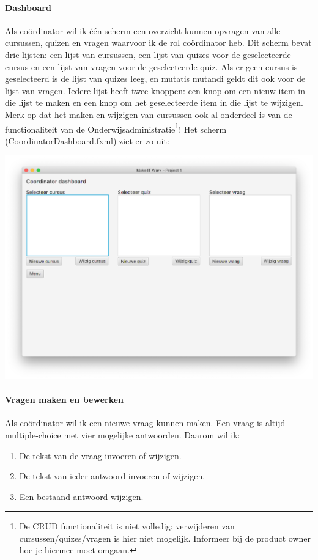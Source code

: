 \documentclass[11pt, a4paper]{article}
\begin{document}
\paragraph{Dashboard}
Als co\"ordinator wil ik \'e\'en scherm een overzicht kunnen opvragen van alle cursussen, quizen en vragen waarvoor ik de rol co\"ordinator heb.
Dit scherm bevat drie lijsten: een lijst van cursussen, een lijst van quizes voor de geselecteerde cursus en een lijst van vragen voor de geselecteerde quiz.
Als er geen cursus is geselecteerd is de lijst van quizes leeg, en mutatis mutandi geldt dit ook voor de lijst van vragen.
Iedere lijst heeft twee knoppen: een knop om een nieuw item in die lijst te maken en een knop om het geselecteerde item in die lijst te wijzigen.
Merk op dat het maken en wijzigen van cursussen ook al onderdeel is van de functionaliteit van de Onderwijsadministratie\footnote{De CRUD functionaliteit is niet volledig: verwijderen van cursussen/quizes/vragen is hier niet mogelijk. Informeer bij de product owner hoe je hiermee moet omgaan.}!
Het scherm (CoordinatorDashboard.fxml) ziet er zo uit:

\begin{center}
\includegraphics[width=\linewidth]{CoordinatorDashboard.png}
\end{center}

\paragraph{Vragen maken en bewerken}
Als co\"ordinator wil ik een nieuwe vraag kunnen maken.
Een vraag is altijd multiple-choice met vier mogelijke antwoorden.
Daarom wil ik:
\begin{enumerate}
\item De tekst van de vraag invoeren of wijzigen.
\item De tekst van ieder antwoord invoeren of wijzigen.
\item Een bestaand antwoord wijzigen.
\end{enumerate}
\end{document}
